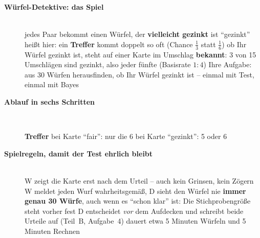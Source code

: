 \begin{description}
\item[{\rot\bf Würfel-Detektive: das Spiel}]~\\[-\lblskip]
\bi
  \ite jedes Paar bekommt einen Würfel, der \textbf{vielleicht gezinkt}
    ist
  \ite \enquote{gezinkt} heißt hier: ein \textbf{Treffer} kommt doppelt
    so oft (Chance $\tfrac13$ statt $\tfrac16$)
  \ite ob Ihr Würfel gezinkt ist, steht auf einer Karte im Umschlag
  \ite \textbf{bekannt}: 3 von 15 Umschlägen sind gezinkt, also jeder
    fünfte (Basisrate $1:4$)
  \ite Ihre Aufgabe: aus 30 Würfen herausfinden, ob Ihr Würfel gezinkt
    ist -- einmal mit Test, einmal mit Bayes
\ei
\os{\newpage}

\item[{\rot\bf Ablauf in sechs Schritten}]~\\
\begin{center}
\end{center}
\bi
  \ite \textbf{Treffer} bei Karte \enquote{fair}: nur die 6 \quad bei
    Karte \enquote{gezinkt}: 5 oder 6
\ei
\os{\newpage}

\item[{\rot\bf Spielregeln, damit der Test ehrlich bleibt}]~\\[-\lblskip]
\bi
  \ite W zeigt die Karte erst nach dem Urteil -- auch kein Grinsen, kein
    Zögern
  \ite W meldet jeden Wurf wahrheitsgemäß, D sieht den Würfel nie
  \ite \textbf{immer genau 30 Würfe}, auch wenn es \enquote{schon klar}
    ist: Die Stichprobengröße steht vorher fest
  \ite D entscheidet \emph{vor} dem Aufdecken und schreibt beide Urteile
    auf (Teil~B, Aufgabe~4)
  \ite dauert etwa 5 Minuten Würfeln und 5 Minuten Rechnen
\ei
\os{\newpage}


\end{description}
